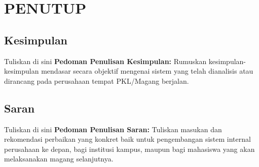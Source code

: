 \chapter{PENUTUP}
\section{Kesimpulan}


Tuliskan di sini \textbf{Pedoman Penulisan Kesimpulan:} Rumuskan kesimpulan-kesimpulan mendasar secara objektif mengenai sistem yang telah dianalisis atau dirancang pada perusahaan tempat PKL/Magang berjalan.


\section{Saran}


Tuliskan di sini \textbf{Pedoman Penulisan Saran:} Tuliskan masukan dan rekomendasi perbaikan yang konkret baik untuk pengembangan sistem internal perusahaan ke depan, bagi institusi kampus, maupun bagi mahasiswa yang akan melaksanakan magang selanjutnya.

